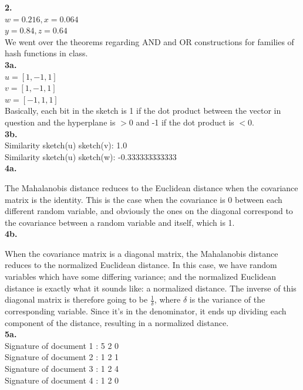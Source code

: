 \documentclass[10pt]{amsart}
\begin{document}
\textbf{2.} \\
  $w = 0.216, x = 0.064$ \\
  $y = 0.84, z = 0.64$ \\

  We went over the theorems regarding AND and OR constructions for families of
  hash functions in class. \\

\textbf{3a.} \\

  $u = [1, -1, 1]$ \\ 
  $v = [1, -1, 1]$ \\ 
  $w = [-1, 1, 1]$ \\

  Basically, each bit in the sketch is 1 if the dot product between the
  vector in question and the hyperplane is $> 0$ and -1 if the dot product 
  is $< 0$. \\

\textbf{3b.} \\

Similarity sketch(u) sketch(v): 1.0 \\
Similarity sketch(u) sketch(w): -0.333333333333 \\

\textbf{4a.} 

The Mahalanobis distance reduces to the Euclidean distance when the covariance
matrix is the identity. This is the case when the covariance is 0 between each
different random variable, and obviously the ones on the diagonal correspond to
the covariance between a random variable and itself, which is 1. \\

\textbf{4b.} 

When the covariance matrix is a diagonal matrix, the Mahalanobis distance
reduces to the normalized Euclidean distance. In this case, we have random
variables which have some differing variance; and the normalized Euclidean
distance is exactly what it sounds like: a normalized distance. The inverse
of this diagonal matrix is therefore going to be $\frac{1}{\delta}$, where
$\delta$ is the variance of the corresponding variable. Since it's in the
denominator, it ends up dividing each component of the distance, resulting in
a normalized distance. \\

\textbf{5a.} \\

Signature of document 1 : 5 2 0 \\
Signature of document 2 : 1 2 1  \\
Signature of document 3 : 1 2 4 \\
Signature of document 4 : 1 2 0 \\
\end{document}
